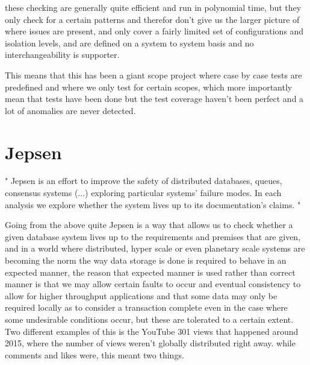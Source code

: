 \documentclass[a4paper,10pt,titlepage]{report}
\begin{document}
    these checking are generally quite efficient and run in polynomial time, but they only check for a certain patterns and therefor don't give us the larger picture of where issues are present, and only cover a fairly limited set of configurations and isolation levels, and are defined on a system to system basis and no interchangeability is supporter.

    This means that this has been a giant scope project where case by case tests are predefined and where we only test for certain scopes, which more importantly mean that tests have been done but the test coverage haven't been perfect and a lot of anomalies are never detected.



    \section{Jepsen}
    "
    Jepsen is an effort to improve the safety of distributed databases, queues, consensus systems  (...) exploring particular systems' failure modes. In each analysis we explore whether the system lives up to its documentation's claims.
    "\cite{jepsonio}
    \\
    \vspace{5mm}

    Going from the above quite Jepsen is a way that allows us to check whether a given database system lives up to the requirements and premises that are given, and in a world where distributed, hyper scale or even planetary scale systems are becoming the norm the way data storage is done is required to behave in an expected manner, the reason that expected manner is used rather than correct manner is that we may allow certain faults to occur and eventual consistency to allow for higher throughput applications and that some data may only be required locally as to consider a transaction complete even in the case where some undesirable conditions occur, but these are tolerated to a certain extent. \\
    \vspace{5mm}
    Two different examples of this is the YouTube 301 views that happened around 2015, where the number of views weren't globally distributed right away. while comments and likes were, this meant two things. \\
\end{document}
